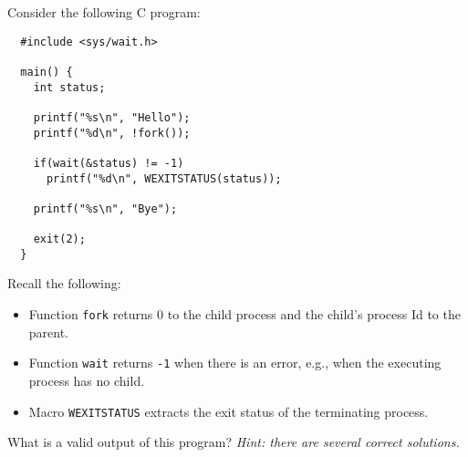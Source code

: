 \begin{problem}{5}

Consider the following C program:

\begin{verbatim}
  #include <sys/wait.h>

  main() {
    int status;
  
    printf("%s\n", "Hello");
    printf("%d\n", !fork());

    if(wait(&status) != -1)
      printf("%d\n", WEXITSTATUS(status));

    printf("%s\n", "Bye");

    exit(2);
  }
\end{verbatim}

Recall the following:
\begin{itemize}
\item Function {\tt fork} returns 0 to the child process and the child's process Id to the parent.
\item Function {\tt wait} returns {\tt -1} when there is an error, e.g.,
when the executing process has no child.
\item Macro {\tt WEXITSTATUS} extracts the exit status of the
terminating process.
\end{itemize}


What is a valid output of this program? 
{\em Hint: there are several correct solutions.}

\end{problem}
